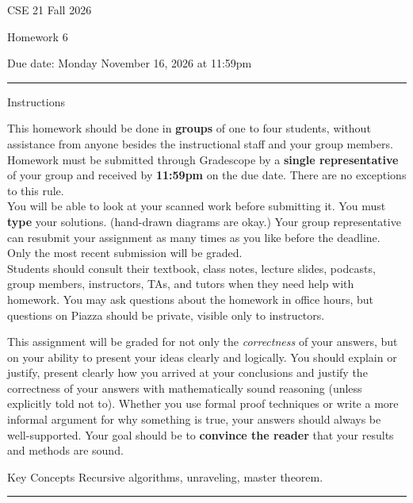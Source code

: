 \documentclass[10pt,letterpaper,unboxed,cm]{article}
\begin{document}
\hfill{CSE 21 Fall 2026}

\hfill{Homework 6}

\hfill{Due date: Monday November 16, 2026 at 11:59pm}

\begin{center}
\begin{minipage}[t]{5.7in}
\rule{\linewidth}{2pt}
{\sc Instructions}\newline

This homework should be done in {\bf groups} of one to four students, without assistance from anyone besides the instructional staff and your group members.  Homework must be submitted through Gradescope by a {\bf single representative} of your group and received by {\bf 11:59pm} on the due date. There are no exceptions to this rule.\\
 
You will be able to look at your scanned work before submitting it. 
 You must {\bf type} your solutions. (hand-drawn diagrams are okay.)
 Your group representative can resubmit your assignment as many times as you like before the deadline. Only the most recent submission will be graded.\\

Students should consult their textbook, class notes, lecture slides, podcasts, group members, instructors, TAs, and tutors when 
they need help with homework. You may ask questions about the homework in office hours, but questions on Piazza should be private, visible only to instructors. 

This assignment will be graded for not only the \emph{correctness} of your answers, but on your ability to present your ideas clearly and logically. You should explain or justify, present clearly how you arrived at your conclusions and justify the correctness of your answers with mathematically sound reasoning (unless explicitly told not to). Whether you use formal proof techniques or write a more informal argument for why something is true, your answers should always be well-supported. Your goal should be to {\bf convince the reader} that your results and methods are sound.






{\sc Key Concepts} Recursive algorithms, unraveling, master theorem.



\rule{\linewidth}{2pt}
\end{minipage} \hfill

\end{center}
\end{document}
